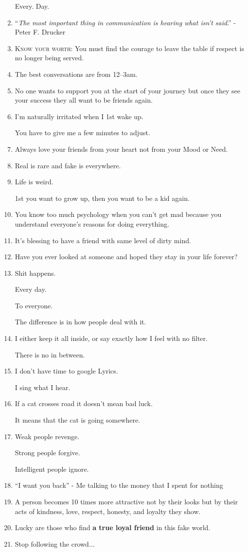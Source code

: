 \documentclass{article}
\begin{document}
\begin{enumerate}
	Every. Day.
	\item ``\textit{The most important thing in communication is hearing what isn't said}.'' - Peter F. Drucker
	\item \textsc{Know your worth}: You must find the courage to leave the table if respect is no longer being served.
	\item The best conversations are from 12--3am.
	\item No one wants to support you at the start of your journey but once they see your success they all want to be friends again.
	\item I'm naturally irritated when I 1st wake up.
	
	You have to give me a few minutes to adjust.
	\item Always love your friends from your heart not from your Mood or Need.
	\item Real is rare and fake is everywhere.
	\item Life is weird.
	
	1st you want to grow up, then you want to be a kid again.
	\item You know too much psychology when you can't get mad because you understand everyone's reasons for doing everything.
	\item It's blessing to have a friend with same level of dirty mind.
	\item Have you ever looked at someone and hoped they stay in your life forever?
	\item Shit happens.
	
	Every day.
	
	To everyone.
	
	The difference is in how people deal with it.
	\item I either keep it all inside, or say exactly how I feel with no filter.
	
	There is no in between.
	\item I don't have time to google Lyrics.
	
	I sing what I hear.
	\item If a cat crosses road it doesn't mean bad luck.
	
	It means that the cat is going somewhere.
	\item Weak people revenge.
	
	Strong people forgive.
	
	Intelligent people ignore.
	\item ``I want you back'' - Me talking to the money that I spent for nothing
	\item A person becomes 10 times more attractive not by their looks but by their acts of kindness, love, respect, honesty, and loyalty they show.
	\item Lucky are those who find \textbf{a true loyal friend} in this fake world.
	\item Stop following the crowd$\ldots$
	

\end{enumerate}
\end{document}
